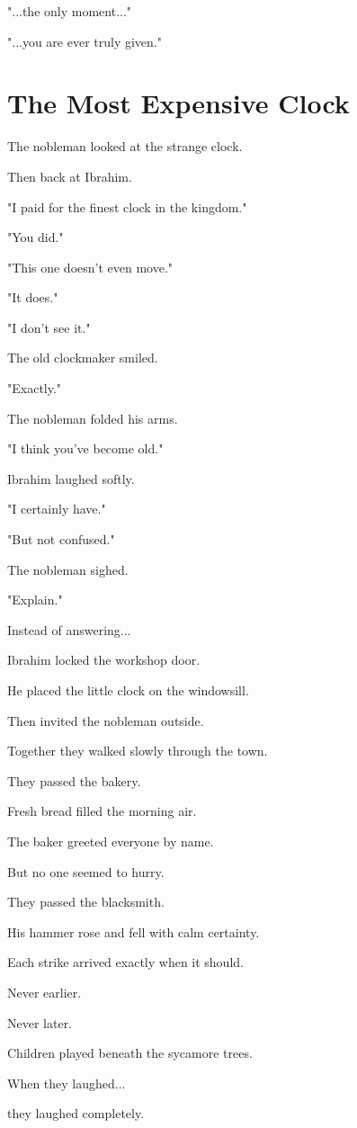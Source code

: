 \documentclass[12pt,openany]{book}
\begin{document}
"...the only moment..."

"...you are ever truly given."
\section*{The Most Expensive Clock}

The nobleman looked at the strange clock.

Then back at Ibrahim.

"I paid for the finest clock in the kingdom."

"You did."

"This one doesn't even move."

"It does."

"I don't see it."

The old clockmaker smiled.

"Exactly."

The nobleman folded his arms.

"I think you've become old."

Ibrahim laughed softly.

"I certainly have."

"But not confused."

The nobleman sighed.

"Explain."

Instead of answering...

Ibrahim locked the workshop door.

He placed the little clock on the windowsill.

Then invited the nobleman outside.

Together they walked slowly through the town.

They passed the bakery.

Fresh bread filled the morning air.

The baker greeted everyone by name.

But no one seemed to hurry.

They passed the blacksmith.

His hammer rose and fell with calm certainty.

Each strike arrived exactly when it should.

Never earlier.

Never later.

Children played beneath the sycamore trees.

When they laughed...

they laughed completely.
\end{document}
